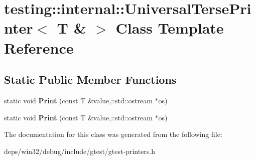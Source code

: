 \hypertarget{classtesting_1_1internal_1_1_universal_terse_printer_3_01_t_01_6_01_4}{}\section{testing\+:\+:internal\+:\+:Universal\+Terse\+Printer$<$ T \& $>$ Class Template Reference}
\label{classtesting_1_1internal_1_1_universal_terse_printer_3_01_t_01_6_01_4}
\subsection*{Static Public Member Functions}
\begin{DoxyCompactItemize}
\item 
\hypertarget{classtesting_1_1internal_1_1_universal_terse_printer_3_01_t_01_6_01_4_a5f0d2e50bb18c00d019389fca869b9d0}{}static void {\bfseries Print} (const T \&value,\+::std\+::ostream $\ast$os)\label{classtesting_1_1internal_1_1_universal_terse_printer_3_01_t_01_6_01_4_a5f0d2e50bb18c00d019389fca869b9d0}

\item 
\hypertarget{classtesting_1_1internal_1_1_universal_terse_printer_3_01_t_01_6_01_4_a5f0d2e50bb18c00d019389fca869b9d0}{}static void {\bfseries Print} (const T \&value,\+::std\+::ostream $\ast$os)\label{classtesting_1_1internal_1_1_universal_terse_printer_3_01_t_01_6_01_4_a5f0d2e50bb18c00d019389fca869b9d0}

\end{DoxyCompactItemize}


The documentation for this class was generated from the following file\+:\begin{DoxyCompactItemize}
\item 
deps/win32/debug/include/gtest/gtest-\/printers.\+h\end{DoxyCompactItemize}
